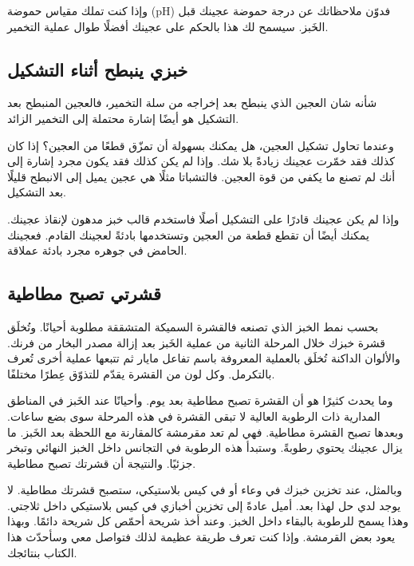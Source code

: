 وإذا كنت تملك مقياس حموضة \textenglish{(pH)} فدوّن ملاحظاتك عن درجة حموضة عجينك قبل الخَبز. سيسمح لك هذا بالحكم على عجينك أفضلًا طوال عملية التخمير.

\subsection{خبزي ينبطح أثناء التشكيل}

شأنه شان العجين الذي ينبطح بعد إخراجه من سلة التخمير، فالعجين المنبطح بعد التشكيل هو أيضًا إشارة محتملة إلى التخمير الزائد.

وعندما تحاول تشكيل العجين، هل يمكنك بسهولة أن تمزّق قطعًا من العجين؟ إذا كان كذلك فقد خمّرت عجينك زيادةً بلا شك. وإذا لم يكن كذلك فقد يكون مجرد إشارة إلى أنك لم تصنع ما يكفي من قوة العجين. فالتشباتا مثلًا هي عجين يميل إلى الانبطح قليلًا بعد التشكيل.

وإذا لم يكن عجينك قادرًا على التشكيل أصلًا فاستخدم قالب خبز مدهون لإنقاذ عجينك. يمكنك أيضًا أن تقطع قطعة من العجين وتستخدمها بادئةً لعجينك القادم. فعجينك الحامض في جوهره مجرد بادئة عملاقة.

\subsection{قشرتي تصبح مطاطية}

بحسب نمط الخبز الذي تصنعه فالقشرة السميكة المتشققة مطلوبة أحيانًا. وتُخلَق قشرة خبزك خلال المرحلة الثانية من عملية الخَبز بعد إزالة مصدر البخار من فرنك. والألوان الداكنة تُخلَق بالعملية المعروفة باسم تفاعل مايار ثم تتبعها عملية أخرى تُعرف بالتكرمل. وكل لون من القشرة يقدّم للتذوّق عِطرًا مختلفًا.

وما يحدث كثيرًا هو أن القشرة تصبح مطاطية بعد يوم. وأحيانًا عند الخَبز في المناطق المدارية ذات الرطوبة العالية لا تبقى القشرة في هذه المرحلة سوى بضع ساعات. وبعدها تصبح القشرة مطاطية. فهي لم تعد مقرمشة كالمقارنة مع اللحظة بعد الخَبز. ما يزال عجينك يحتوي رطوبةً. وستبدأ هذه الرطوبة في التجانس داخل الخبز النهائي وتبخر جزئيًا. والنتيجة أن قشرتك تصبح مطاطية.

وبالمثل، عند تخزين خبزك في وعاء أو في كيس بلاستيكي، ستصبح قشرتك مطاطية. لا يوجد لدي حل لهذا بعد. أميل عادةً إلى تخزين أخبازي في كيس بلاستيكي داخل ثلاجتي. وهذا يسمح للرطوبة بالبقاء داخل الخبز. وعند أخذ شريحة أحمّص كل شريحة دائمًا. وبهذا يعود بعض القرمشة. وإذا كنت تعرف طريقة عظيمة لذلك فتواصل معي وسأحدّث هذا الكتاب بنتائجك.


